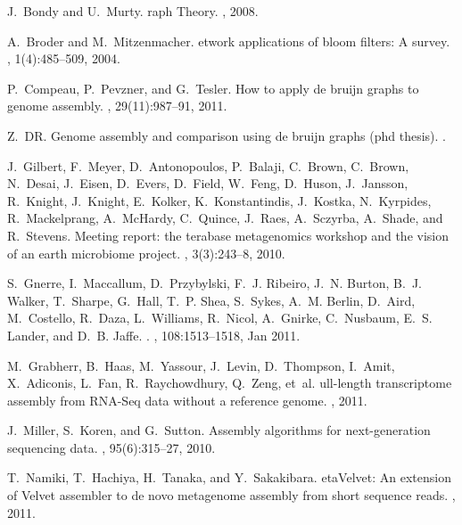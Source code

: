 \documentclass{pnastwo}
\begin{document}
\begin{article}
\begin{thebibliography}{10}
J.~Bondy and U.~Murty.
raph {T}heory.
, 2008.

A.~Broder and M.~Mitzenmacher.
etwork applications of bloom filters: {A} survey.
, 1(4):485--509, 2004.

P.~Compeau, P.~Pevzner, and G.~Tesler.
\newblock How to apply de bruijn graphs to genome assembly.
, 29(11):987--91, 2011.

Z.~DR.
\newblock Genome assembly and comparison using de bruijn graphs (phd thesis).
.

J.~Gilbert, F.~Meyer, D.~Antonopoulos, P.~Balaji, C.~Brown, C.~Brown, N.~Desai,
  J.~Eisen, D.~Evers, D.~Field, W.~Feng, D.~Huson, J.~Jansson, R.~Knight,
  J.~Knight, E.~Kolker, K.~Konstantindis, J.~Kostka, N.~Kyrpides,
  R.~Mackelprang, A.~McHardy, C.~Quince, J.~Raes, A.~Sczyrba, A.~Shade, and
  R.~Stevens.
\newblock Meeting report: the terabase metagenomics workshop and the vision of
  an earth microbiome project.
, 3(3):243--8, 2010.

S.~Gnerre, I.~Maccallum, D.~Przybylski, F.~J. Ribeiro, J.~N. Burton, B.~J.
  Walker, T.~Sharpe, G.~Hall, T.~P. Shea, S.~Sykes, A.~M. Berlin, D.~Aird,
  M.~Costello, R.~Daza, L.~Williams, R.~Nicol, A.~Gnirke, C.~Nusbaum, E.~S.
  Lander, and D.~B. Jaffe.
.
, 108:1513--1518, Jan 2011.

M.~Grabherr, B.~Haas, M.~Yassour, J.~Levin, D.~Thompson, I.~Amit, X.~Adiconis,
  L.~Fan, R.~Raychowdhury, Q.~Zeng, et~al.
ull-length transcriptome assembly from {R}{N}{A}-{S}eq data
  without a reference genome.
, 2011.

J.~Miller, S.~Koren, and G.~Sutton.
\newblock Assembly algorithms for next-generation sequencing data.
, 95(6):315--27, 2010.

T.~Namiki, T.~Hachiya, H.~Tanaka, and Y.~Sakakibara.
eta{V}elvet: {A}n extension of {V}elvet assembler to de novo
  metagenome assembly from short sequence reads.
, 2011.


\end{thebibliography}
\end{article}
\end{document}
